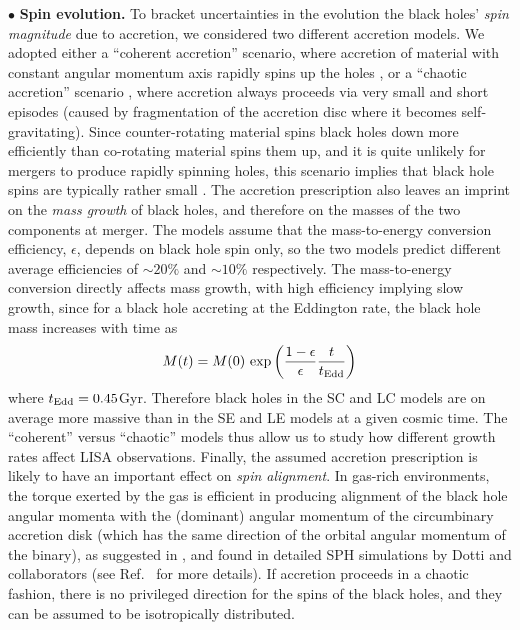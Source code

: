 \documentclass{iopart}
\begin{document}
$\bullet$  {\bf Spin evolution.} To bracket uncertainties in the evolution 
the black holes' {\it spin magnitude} due to accretion,  we considered two
different accretion models. We adopted either a ``coherent
accretion'' scenario, where accretion of material with constant angular
momentum axis rapidly spins up the holes \cite{Bardeen:1970,Thorne:1974ve}, or
a ``chaotic accretion'' scenario \cite{King:2006uu}, where accretion always
proceeds via very small and short episodes (caused by fragmentation of the
accretion disc where it becomes self-gravitating). Since counter-rotating
material spins black holes down more efficiently than co-rotating material
spins them up, and it is quite unlikely for mergers to produce rapidly
spinning holes, this scenario implies that black hole spins are typically
rather small \cite{Berti:2008af}. The accretion prescription also leaves an imprint on the {\it mass growth} of black holes,
and therefore on the masses of the two components at merger. 
The models assume that the mass-to-energy conversion efficiency, $\epsilon$, depends on black hole spin 
only, so the two models predict different average efficiencies of $\sim 20\%$ and $\sim 10\%$ respectively. 
The mass-to-energy conversion directly affects mass growth, with high efficiency implying slow growth, since 
for a black hole accreting at the Eddington rate, the black hole mass increases with time as
\begin{equation}
M(t)=M(0)\,\exp\left(\frac{1-\epsilon}{\epsilon} \frac{t}{t_{\rm Edd}}\right)
\end{equation}
where $t_{\rm Edd}=0.45$Gyr. Therefore black holes in the SC and LC models are on average more massive 
than in the SE and LE models at a given cosmic time. The ``coherent'' versus ``chaotic'' models thus allow us to study how 
different growth rates affect LISA observations.  Finally, the assumed accretion prescription is 
likely to have an important effect on {\it spin alignment}. In gas-rich 
environments, the torque exerted by the gas is efficient in producing 
alignment of the black hole angular momenta with the (dominant) angular
momentum of the circumbinary accretion disk (which has the same direction
of the orbital angular momentum of the binary), as suggested in 
\cite{Bogdanovic:2007hp}, and found in detailed
SPH simulations by Dotti and collaborators \cite{dotti} 
(see Ref.~\cite{Berti:2008af} for more details). If accretion proceeds
in a chaotic fashion, there is no privileged direction for the spins
of the black holes, and they can be assumed to be isotropically distributed.
\end{document}
